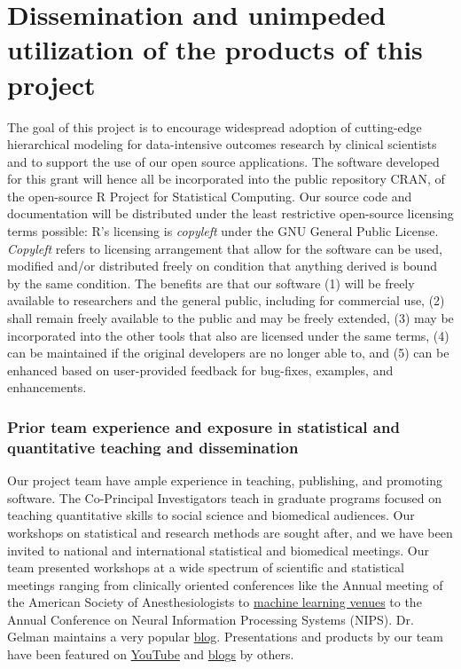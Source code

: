 \documentclass[11pt,notitlepage]{article}
\begin{document}
\section*{Dissemination and unimpeded utilization of the products of this project}
The goal of this project is to encourage widespread adoption of cutting-edge 
hierarchical modeling for data-intensive outcomes research by clinical scientists and to support the use of our 
open source applications. The software developed for this grant will hence all be incorporated into the public repository CRAN, 
of the open-source R Project for Statistical Computing. Our source code and documentation 
will be distributed under the least restrictive open-source licensing terms possible: R's licensing is \textit{copyleft} under the 
GNU General Public License. \textit{Copyleft} refers to licensing arrangement that allow for the software can be used, modified and/or 
distributed freely on condition that anything derived is bound by the same condition. The benefits  are that our software 
(1) will be freely available to researchers and the general public, including for commercial use, 
(2) shall remain freely available to the public and may be freely extended, 
(3) may be incorporated into the other tools that also are licensed under the same terms, 
(4) can be maintained if the original developers are no longer able to, and
(5) can be enhanced based on user-provided feedback for bug-fixes, examples, and enhancements.

\subsubsection*{Prior team experience and exposure in statistical and quantitative teaching and dissemination}
Our project team have ample experience in teaching, publishing, and promoting software. The Co-Principal Investigators teach 
in graduate programs focused on teaching quantitative skills to social science and biomedical audiences. 
Our workshops on statistical and research methods are sought after, and we have been invited to national and international statistical and  
biomedical meetings. Our team presented workshops at a wide spectrum of scientific and statistical meetings ranging from clinically oriented 
conferences like the Annual meeting of the American Society of Anesthesiologists to \href{https://www.youtube.com/watch?v=pHsuIaPbNbY}{machine learning venues} 
to the Annual Conference on Neural Information Processing Systems (NIPS). Dr. Gelman maintains a very popular \href{http://andrewgelman.com/}{blog}. 
Presentations and products by our team have been featured on \href{https://www.youtube.com/watch?v=X31xqNHcvQs}{YouTube} and 
\href{http://thinkinator.com/2016/01/12/r-users-will-now-inevitably-become-bayesians/}{blogs} by others.   
\end{document}
